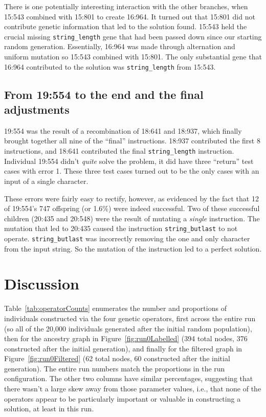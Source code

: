 There is one potentially interesting interaction with the other branches, 
when 15:543 combined with 15:801 to create 16:964. It turned out
that 15:801 did not contribute genetic information that led to the solution found. 15:543 held the crucial missing \texttt{string\_length} gene that had been passed down since our starting random generation. Essentially, 16:964 was made through alternation and uniform mutation so 15:543 combined with 15:801. The only substantial gene that 16:964 contributed to the solution was \texttt{string\_length} from 15:543.

\subsection{From 19:554 to the end and the final adjustments}

19:554 was the result of a recombination of 18:641 and 18:937, which finally
brought together all nine of the ``final'' instructions. 18:937 contributed
the first 8 instructions, and 18:641 contributed the final 
\texttt{string\_length} instruction. Individual 19:554 didn't \emph{quite} solve the
problem, it did have three ``return'' test cases with error 1. These three test cases turned out to be the only cases with an input of a single character.

These errors were fairly easy to rectify, however, as evidenced by the 
fact that 12 of 19:554's 747 offspring (or 1.6\%) were indeed successful.
Two of these successful children (20:435 and 20:548) were the result of 
mutating a \emph{single} instruction.  The mutation that led to 20:435 
caused the instruction \texttt{string\_butlast} to not operate. \texttt{string\_butlast} was incorrectly removing the one and only character
from the input string. So the mutation of the instruction led to a perfect solution.

\section{Discussion}
\label{sec:discussion}


Table~\ref{tab:operatorCounts} enumerates the number and proportions 
of individuals constructed via the four genetic operators, first across the
entire run (so all of the 20,000 individuals generated after the initial
random population), then for the ancestry graph in 
Figure~\ref{fig:run0Labelled} (394 total nodes, 
376 constructed after the initial generation), and finally for the filtered
graph in Figure~\ref{fig:run0Filtered} (62 total nodes, 60 constructed after 
the initial generation). The entire run numbers match the proportions
in the run configuration. The other two columns have similar percentages,
suggesting that there wasn't a large skew away from those parameter values,
i.e., that none of the operators appear to be particularly important or
valuable in constructing a solution, at least in this run.

